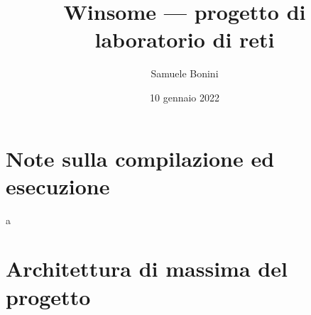 \documentclass[a4paper,8pt]{article} %
\title{Winsome --- progetto di laboratorio di reti} %
\author{Samuele Bonini}
\date{10 gennaio 2022}
\begin{document}
\maketitle %



\tableofcontents %
\setlength{\parskip}{0.5em}

\section{Note sulla compilazione ed esecuzione}
a

\section{Architettura di massima del progetto} %
\end{document}
